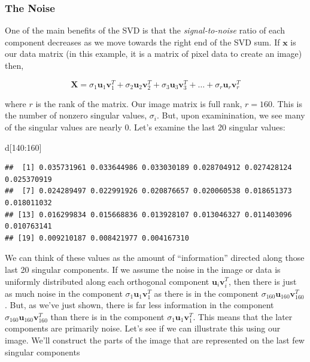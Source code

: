 \documentclass[
]{article}
\newenvironment{Shaded}{\begin{snugshade}}{\end{snugshade}}
\newcommand{\DecValTok}[1]{\textcolor[rgb]{0.00,0.00,0.81}{#1}}
\newcommand{\NormalTok}[1]{#1}
\newcommand{\SpecialCharTok}[1]{\textcolor[rgb]{0.00,0.00,0.00}{#1}}
\theoremstyle{definition}
\theoremstyle{definition}
\theoremstyle{definition}
\theoremstyle{definition}
\theoremstyle{remark}
\begin{document}
\hypertarget{the-noise}{%
\subsubsection{The Noise}\label{the-noise}}

One of the main benefits of the SVD is that the \emph{signal-to-noise} ratio of each component decreases as we move towards the right end of the SVD sum. If \(\mathbf{x}\) is our data matrix (in this example, it is a matrix of pixel data to create an image) then,

\begin{equation}
\mathbf{X}= \sigma_1\mathbf{u}_1\mathbf{v}_1^T + \sigma_2\mathbf{u}_2\mathbf{v}_2^T + \sigma_3\mathbf{u}_3\mathbf{v}_3^T + \dots + \sigma_r\mathbf{u}_r\mathbf{v}_r^T
\label{eq:svdsum}
\end{equation}

where \(r\) is the rank of the matrix. Our image matrix is full rank, \(r=160\). This is the number of nonzero singular values, \(\sigma_i\). But, upon examinination, we see many of the singular values are nearly 0. Let's examine the last 20 singular values:

\begin{Shaded}
\begin{Highlighting}[]
\NormalTok{d[}\DecValTok{140}\SpecialCharTok{:}\DecValTok{160}\NormalTok{]}
\end{Highlighting}
\end{Shaded}

\begin{verbatim}
##  [1] 0.035731961 0.033644986 0.033030189 0.028704912 0.027428124 0.025370919
##  [7] 0.024289497 0.022991926 0.020876657 0.020060538 0.018651373 0.018011032
## [13] 0.016299834 0.015668836 0.013928107 0.013046327 0.011403096 0.010763141
## [19] 0.009210187 0.008421977 0.004167310
\end{verbatim}

We can think of these values as the amount of ``information'' directed along those last 20 singular components. If we assume the noise in the image or data is uniformly distributed along each orthogonal component \(\mathbf{u}_i\mathbf{v}_i^T\), then there is just as much noise in the component \(\sigma_1\mathbf{u}_1\mathbf{v}_1^T\) as there is in the component \(\sigma_{160}\mathbf{u}_{160}\mathbf{v}_{160}^T\). But, as we've just shown, there is far less information in the component \(\sigma_{160}\mathbf{u}_{160}\mathbf{v}_{160}^T\) than there is in the component \(\sigma_1\mathbf{u}_1\mathbf{v}_1^T\). This means that the later components are primarily noise. Let's see if we can illustrate this using our image. We'll construct the parts of the image that are represented on the last few singular components
\end{document}
